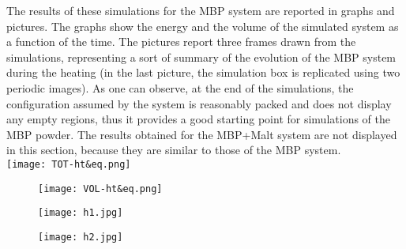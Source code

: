 \begin{itemize}
The results of these simulations for the MBP system are reported in graphs and pictures. The graphs show the energy and the volume of the simulated system as a function of the time. The pictures report three frames drawn from the simulations, representing a sort of summary of the evolution of the MBP system during the heating (in the last picture, the simulation box is replicated using two periodic images). As one can observe, at the end of the simulations, the configuration assumed by the system is reasonably packed and does not display any empty regions, thus it provides a good starting point for simulations of the MBP powder. The results obtained for the MBP+Malt system are not displayed in this section, because they are similar to those of the MBP system. \\
\texttt{[image: TOT-ht\&eq.png]}

\begin{figure}[H]
\centering
\begin{minipage}[t]{0.95\textwidth}
	\centering
    \texttt{[image: VOL-ht\&eq.png]}
    
\end{minipage} 
\end{figure}

\begin{figure}[H]
\centering
\begin{minipage}[t]{0.85\textwidth}
	\centering
    \texttt{[image: h1.jpg]}

\vspace{0.35cm}    
    
    \texttt{[image: h2.jpg]}
    
\end{minipage} 
\end{figure}


\end{itemize}
